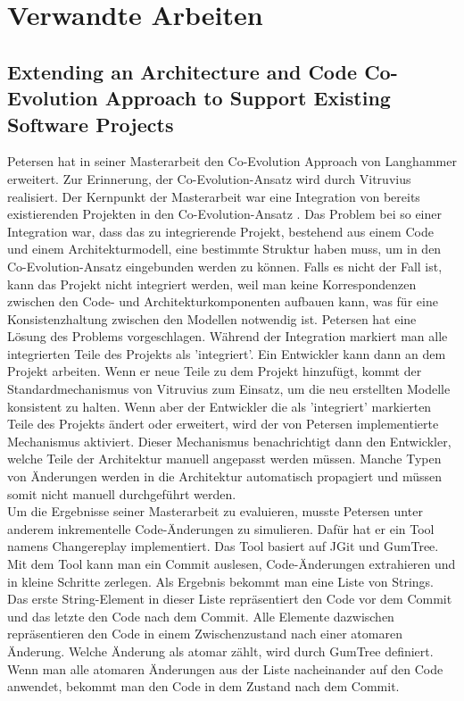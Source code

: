 \chapter{Verwandte Arbeiten}
\label{ch:Verwandte Arbeiten}


\section{Extending an Architecture and Code Co-Evolution Approach to Support Existing Software Projects}\label{sec:Extending an Architecture and Code Co-Evolution Approach to Support Existing Software Projects}
Petersen hat in seiner Masterarbeit \cite{petersen2016} den Co-Evolution Approach von Langhammer \cite{langhammer2017} erweitert. Zur Erinnerung, der Co-Evolution-Ansatz wird durch Vitruvius \cite{vitruvius} realisiert. Der Kernpunkt der Masterarbeit war eine Integration von bereits existierenden Projekten in den Co-Evolution-Ansatz \cite{langhammer2017}. Das Problem bei so einer Integration war, dass das zu integrierende Projekt, bestehend aus einem Code und einem Architekturmodell, eine bestimmte Struktur haben muss, um in den Co-Evolution-Ansatz eingebunden werden zu können. Falls es nicht der Fall ist, kann das Projekt nicht integriert werden, weil man keine Korrespondenzen zwischen den Code- und Architekturkomponenten aufbauen kann, was für eine Konsistenzhaltung zwischen den Modellen notwendig ist. Petersen hat eine Lösung des Problems vorgeschlagen. Während der Integration markiert man alle integrierten Teile des Projekts als 'integriert'. Ein Entwickler kann dann an dem Projekt arbeiten. Wenn er neue Teile zu dem Projekt hinzufügt, kommt der Standardmechanismus von Vitruvius zum Einsatz, um die neu erstellten Modelle konsistent zu halten. Wenn aber der Entwickler die als 'integriert' markierten Teile des Projekts ändert oder erweitert, wird der von Petersen implementierte Mechanismus aktiviert. Dieser Mechanismus benachrichtigt dann den Entwickler, welche Teile der Architektur manuell angepasst werden müssen. Manche Typen von Änderungen werden in die Architektur automatisch propagiert und müssen somit nicht manuell durchgeführt werden.
\\
Um die Ergebnisse seiner Masterarbeit zu evaluieren, musste Petersen unter anderem inkrementelle Code-Änderungen zu simulieren. Dafür hat er ein Tool namens Changereplay \cite{changereplay} implementiert. Das Tool basiert auf JGit\cite{jgit} und GumTree\cite{gumtree}. Mit dem Tool kann man ein Commit auslesen, Code-Änderungen extrahieren und in kleine Schritte zerlegen. Als Ergebnis bekommt man eine Liste von Strings. Das erste String-Element in dieser Liste repräsentiert den Code vor dem Commit und das letzte den Code nach dem Commit. Alle Elemente dazwischen repräsentieren den Code in einem Zwischenzustand nach einer atomaren Änderung. Welche Änderung als atomar zählt, wird durch GumTree definiert. Wenn man alle atomaren Änderungen aus der Liste nacheinander auf den Code anwendet, bekommt man den Code in dem Zustand nach dem Commit. 
